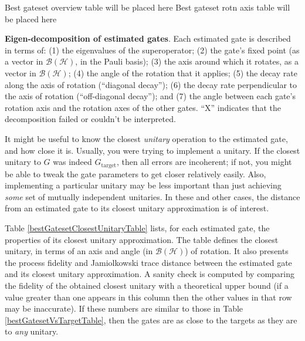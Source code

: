 \documentclass{article}[11pt]
\newcommand{\putfield}[2]{#2}
\begin{document}
\begin{table}[h]
\small
\begin{center}
\putfield{bestGatesetDecompTable}{Best gateset overview table will be placed here}
\vspace{2em}
\putfield{bestGatesetRotnAxisTable}{Best gateset rotn axis table will be placed here}
\caption{\putfield{tt_bestGatesetDecompTable}{}\putfield{tt_bestGatesetRotnAxisTable}{}\textbf{Eigen-decomposition of estimated gates}.  Each estimated gate is described in terms of: (1) the eigenvalues of the superoperator; (2) the gate's fixed point (as a vector in $\mathcal{B}(\mathcal{H})$, in the Pauli basis); (3)  the axis around which it rotates, as a vector in $\mathcal{B}(\mathcal{H})$; (4) the angle of the rotation that it applies; (5) the decay rate along the axis of rotation (``diagonal decay''); (6) the decay rate perpendicular to the axis of rotation (``off-diagonal decay''); and (7) the angle between each gate's rotation axis and the rotation axes of the other gates.  ``X'' indicates that the decomposition failed or couldn't be interpreted. \label{bestGatesetDecompTable}}
\end{center}
\end{table}

It might be useful to know the closest \emph{unitary} operation to the estimated gate, and how close it is.  Usually, you were trying to implement a unitary.  If the closest unitary to $G$ was indeed $G_{\mathrm{target}}$, then all errors are incoherent; if not, you might be able to tweak the gate parameters to get closer relatively easily.  Also, implementing a particular unitary may be less important than just achieving \emph{some} set of mutually independent unitaries.  In these and other cases, the distance from an estimated gate to its closest unitary approximation is of interest.

Table \ref{bestGatesetClosestUnitaryTable} lists, for each estimated gate, the properties of its closest unitary approximation.  The table defines the closest unitary, in terms of an axis and angle (in $\mathcal{B}(\mathcal{H})$) of rotation.  It also presents the process fidelity and Jamiolkowski trace distance between the estimated gate and its closest unitary approximation.  A sanity check is computed by comparing the fidelity of the obtained closest unitary with a theoretical upper bound (if a value greater than one appears in this column then the other values in that row may be inaccurate).  If these numbers are similar to those in Table \ref{bestGatesetVsTargetTable}, then the gates are as close to the targets as they are to \emph{any} unitary.
\end{document}
